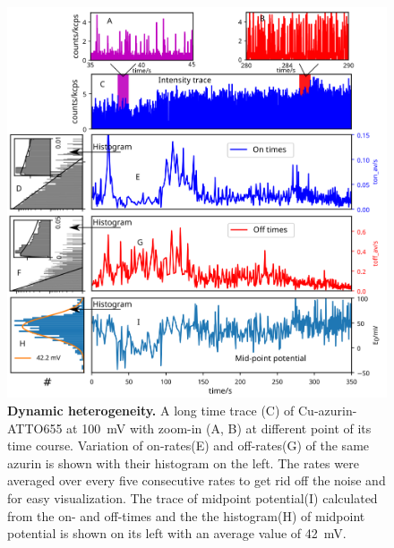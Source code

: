 \begin{figure}
	\centering
	\includegraphics[width=\textwidth]{long_azurin_trace}
	\caption{\textbf{Dynamic heterogeneity.} A long time trace (C) of Cu-azurin-ATTO655 at \SI{100}{\mV} with zoom-in (A, B) at different point of its time course.
	Variation of on-rates(E) and off-rates(G) of the same azurin is shown with their histogram on the left.
	The rates were averaged over every five consecutive rates to get rid off the noise and for easy visualization.
	The trace of midpoint potential(I) calculated from the on- and off-times and the the histogram(H) of midpoint potential is shown on its left with an average value of \SI{42}{\mV}.
	}
	\label{fig:long_azurin_trace}
\end{figure}

